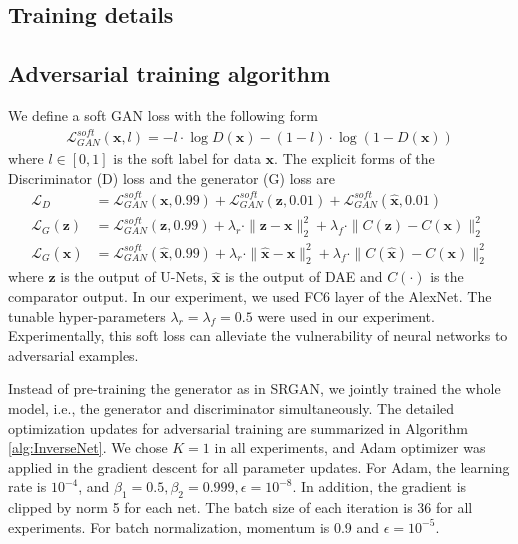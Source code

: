 \documentclass[10pt,twocolumn,letterpaper]{article}
\begin{document}
\begin{appendices}

\section{Training details}

\subsection{Adversarial training algorithm}
We define a soft GAN loss with the following form
\begin{align}
\mathcal{L}_{GAN}^{soft}(\mathbf{x}, l) = -l \cdot \log D(\mathbf{x}) - (1-l) \cdot \log (1-D(\mathbf{x}))
\end{align}
where $l\in [0,1]$ is the soft label for data $\mathbf{x}$. 
The explicit forms of the Discriminator (D) loss and the generator (G) loss are 
\begin{align}
\mathcal{L}_D &= \mathcal{L}_{GAN}^{soft}(\mathbf{x}, 0.99) + \mathcal{L}_{GAN}^{soft}(\mathbf{z}, 0.01) + \mathcal{L}_{GAN}^{soft}(\hat{\mathbf{x}}, 0.01)  \\
\mathcal{L}_G(\mathbf{z}) &= \mathcal{L}_{GAN}^{soft}(\mathbf{z}, 0.99) + \lambda_r\cdot\|\mathbf{z} - \mathbf{x} \|_2^2 + \lambda_f\cdot\|C(\mathbf{z}) - C(\mathbf{x})\|_2^2 \\
\mathcal{L}_G(\hat{\mathbf{x}}) &= \mathcal{L}_{GAN}^{soft}(\hat{\mathbf{x}}, 0.99) + \lambda_r\cdot\|\hat{\mathbf{x}} - \mathbf{x} \|_2^2 + \lambda_f\cdot\|C(\hat{\mathbf{x}}) - C(\mathbf{x})\|_2^2 
\end{align}
where $\mathbf{z}$ is the output of U-Nets, $\hat{\mathbf{x}}$ is the output of DAE and $C(\cdot)$ is the comparator output.
In our experiment, we used FC6 layer of the AlexNet. The tunable hyper-parameters $\lambda_r=\lambda_f=0.5$ were used in 
our experiment. Experimentally, this soft loss can alleviate the vulnerability of neural networks to adversarial examples.

Instead of pre-training the generator as in SRGAN, we jointly trained the whole model, i.e., the generator and discriminator simultaneously. 
The detailed optimization updates for adversarial training are summarized in Algorithm \ref{alg:InverseNet}. 
We chose $K=1$ in all experiments, and Adam \cite{kingma2014adam} optimizer was applied in the gradient descent for all parameter updates. 
For Adam, the learning rate is $10^{-4}$, and $\beta_1=0.5, \beta_2=0.999, \epsilon=10^{-8}$. 
In addition, the gradient is clipped by norm 5 for each net. 
The batch size of each iteration is 36 for all experiments. 
For batch normalization, momentum is 0.9 and $\epsilon=10^{-5}$. 


\end{appendices}
\end{document}
